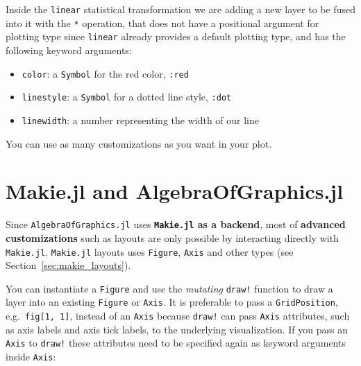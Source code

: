 \documentclass[
  notoc %
]{tufte-book}
\providecommand{\tightlist}{%
  \setlength{\itemsep}{0pt}\setlength{\parskip}{0pt}
}
\newcommand{\passthrough}[1]{#1}
\begin{document}
Inside the \passthrough{\lstinline!linear!} statistical transformation
we are adding a new layer to be fused into it with the
\passthrough{\lstinline!*!} operation, that does not have a positional
argument for plotting type since \passthrough{\lstinline!linear!}
already provides a default plotting type, and has the following keyword
arguments:

\begin{itemize}
\tightlist
\item
  \passthrough{\lstinline!color!}: a \passthrough{\lstinline!Symbol!}
  for the red color, \passthrough{\lstinline!:red!}
\item
  \passthrough{\lstinline!linestyle!}: a
  \passthrough{\lstinline!Symbol!} for a dotted line style,
  \passthrough{\lstinline!:dot!}
\item
  \passthrough{\lstinline!linewidth!}: a number representing the width
  of our line
\end{itemize}

You can use as many customizations as you want in your plot.

\hypertarget{sec:aog_makie}{%
\section{Makie.jl and AlgebraOfGraphics.jl}\label{sec:aog_makie}}

Since \passthrough{\lstinline!AlgebraOfGraphics.jl!} uses
\textbf{\passthrough{\lstinline!Makie.jl!} as a backend}, most of
\textbf{advanced customizations} such as layouts are only possible by
interacting directly with \passthrough{\lstinline!Makie.jl!}.
\passthrough{\lstinline!Makie.jl!} layouts uses
\passthrough{\lstinline!Figure!}, \passthrough{\lstinline!Axis!} and
other types (see Section~\ref{sec:makie_layouts}).

You can instantiate a \passthrough{\lstinline!Figure!} and use the
\emph{mutating} \passthrough{\lstinline"draw!"} function to draw a layer
into an existing \passthrough{\lstinline!Figure!} or
\passthrough{\lstinline!Axis!}. It is preferable to pass a
\passthrough{\lstinline!GridPosition!},
e.g.~\passthrough{\lstinline!fig[1, 1]!}, instead of an
\passthrough{\lstinline!Axis!} because \passthrough{\lstinline"draw!"}
can pass \passthrough{\lstinline!Axis!} attributes, such as axis labels
and axis tick labels, to the underlying visualization. If you pass an
\passthrough{\lstinline!Axis!} to \passthrough{\lstinline"draw!"} these
attributes need to be specified again as keyword arguments inside
\passthrough{\lstinline!Axis!}:
\end{document}
